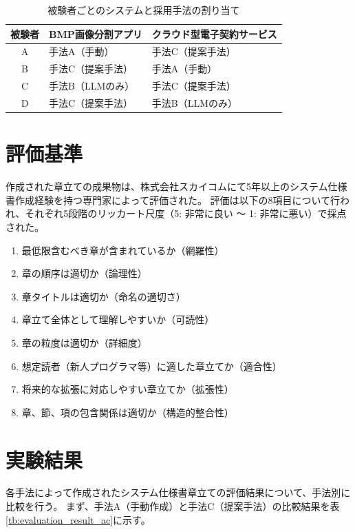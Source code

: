 \begin{table}[h]
  \caption{被験者ごとのシステムと採用手法の割り当て}
  \label{tb:experiment_allocation}
  \centering
  \begin{tabular}{|c|l|l|}
    \hline
    \textbf{被験者} & \textbf{BMP画像分割アプリ} & \textbf{クラウド型電子契約サービス} \\
    \hline\hline
    A & 手法A（手動） & 手法C（提案手法） \\
    \hline
    B & 手法C（提案手法） & 手法A（手動） \\
    \hline
    C & 手法B（LLMのみ） & 手法C（提案手法） \\
    \hline
    D & 手法C（提案手法） & 手法B（LLMのみ） \\
    \hline
  \end{tabular}
\end{table}

\section{評価基準}
作成された章立ての成果物は、株式会社スカイコムにて5年以上のシステム仕様書作成経験を持つ専門家によって評価された。
評価は以下の8項目について行われ、それぞれ5段階のリッカート尺度（5: 非常に良い 〜 1: 非常に悪い）で採点された。

\begin{enumerate}
    \item 最低限含むべき章が含まれているか（網羅性）
    \item 章の順序は適切か（論理性）
    \item 章タイトルは適切か（命名の適切さ）
    \item 章立て全体として理解しやすいか（可読性）
    \item 章の粒度は適切か（詳細度）
    \item 想定読者（新人プログラマ等）に適した章立てか（適合性）
    \item 将来的な拡張に対応しやすい章立てか（拡張性）
    \item 章、節、項の包含関係は適切か（構造的整合性）
\end{enumerate}

\section{実験結果}
各手法によって作成されたシステム仕様書章立ての評価結果について、手法別に比較を行う。
まず、手法A（手動作成）と手法C（提案手法）の比較結果を表\ref{tb:evaluation_result_ac}に示す。

